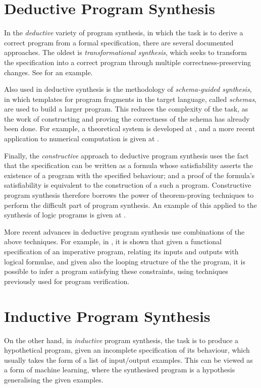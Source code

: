 \documentclass[a4paper,twoside,notitlepage]{report}
\begin{document}
\section{Deductive Program Synthesis}

In the \emph{deductive} variety of program synthesis, in which the task is to 
derive a correct program from a formal specification, there are several 
documented approaches. The oldest is \emph{transformational synthesis}, which 
seeks to transform the specification into a correct program through multiple 
correctness-preserving changes. See \cite{cheatham86} for an example.

Also used in deductive synthesis is the methodology of \emph{schema-guided 
synthesis}, in which templates for program fragments in the target language, 
called \emph{schemas}, are used to build a larger program. This reduces the 
complexity of the task, as the work of constructing and proving the 
correctness of the schema has already been done. For example, a theoretical 
system is developed at \cite{flener97}, and a more recent application to 
numerical computation is given at \cite{colon05}.

Finally, the \emph{constructive} approach to deductive program synthesis uses 
the fact that the specification can be written as a formula whose 
satisfiability asserts the existence of a program with the specified 
behaviour; and a proof of the formula's satisfiability is equivalent to the 
construction of a such a program. Constructive program synthesis therefore 
borrows the power of theorem-proving techniques to perform the difficult part 
of program synthesis. An example of this applied to the synthesis of logic 
programs is given at \cite{bundy90}.

More recent advances in deductive program synthesis use combinations of the 
above techniques. For example, in \cite{popl10syn}, it is shown that given a 
functional specification of an imperative program, relating its inputs and 
outputs with logical formulae, and given also the looping structure of the the 
program, it is possible to infer a program satisfying these constraints, using 
techniques previously used for program verification.

\section{Inductive Program Synthesis}

On the other hand, in \emph{inductive} program synthesis, the task is to 
produce a hypothetical program, given an incomplete specification of its 
behaviour, which usually takes the form of a list of input/output examples. 
This can be viewed as a form of machine learning, where the synthesised 
program is a hypothesis generalising the given examples.
\end{document}
